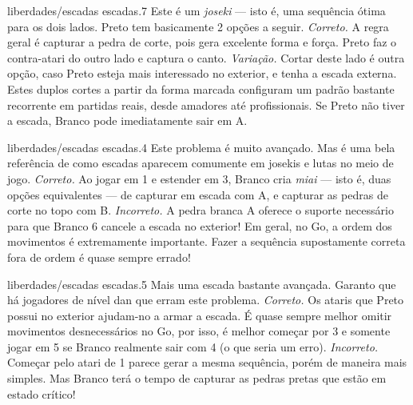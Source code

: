 \problemAnswerDiagram
  {liberdades/escadas}
  {escadas.7}
  {Este é um \emph{joseki} --- isto é, uma sequência ótima para os dois lados. Preto tem basicamente 2 opções a seguir.}
  {\emph{Correto.} A regra geral é capturar a pedra de corte, pois gera excelente forma e força. Preto faz o contra-atari do outro lado e captura o canto.}
  {\emph{Variação.} Cortar deste lado é outra opção, caso Preto esteja mais interessado no exterior, e tenha a escada externa. Estes duplos cortes a partir da forma marcada configuram um padrão bastante recorrente em partidas reais, desde amadores até profissionais. Se Preto não tiver a escada, Branco pode imediatamente sair em A.}

\problemAnswerDiagram
  {liberdades/escadas}
  {escadas.4}
  {Este problema é muito avançado. Mas é uma bela referência de como escadas aparecem comumente em josekis e lutas no meio de jogo.}
  {\emph{Correto.} Ao jogar em 1 e estender em 3, Branco cria  \emph{miai} --- isto é, duas opções equivalentes --- de capturar em escada com A, e capturar as pedras de corte no topo com B.}
  {\emph{Incorreto.} A pedra branca A oferece o suporte necessário para que Branco 6 cancele a escada no exterior! Em geral, no Go, a ordem dos movimentos é extremamente importante. Fazer a sequência supostamente correta fora de ordem é quase sempre errado!}

\problemAnswerDiagram
  {liberdades/escadas}
  {escadas.5}
  {Mais uma escada bastante avançada. Garanto que há jogadores de nível dan que erram este problema.}
  {\emph{Correto.} Os ataris que Preto possui no exterior ajudam-no a armar a escada. É quase sempre melhor omitir movimentos desnecessários no Go, por isso, é melhor começar por 3 e somente jogar em 5 se Branco realmente sair com 4 (o que seria um erro).}
  {\emph{Incorreto.} Começar pelo atari de 1 parece gerar a mesma sequência, porém de maneira mais simples. Mas Branco terá o tempo de capturar as pedras pretas que estão em estado crítico!}